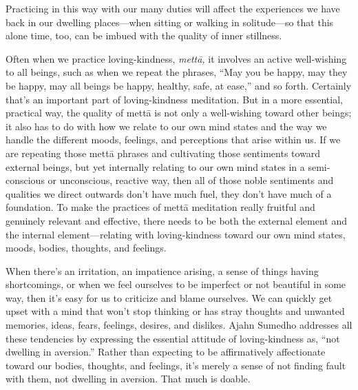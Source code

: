 Practicing in this way with our many duties will affect the experiences 
we have back in our dwelling places---when sitting or walking in 
solitude---so that this alone time, too, can be imbued with the quality 
of inner stillness.


Often when we practice loving-kindness, \emph{mettā,} it involves an 
active well-wishing to all beings, such as when we repeat the phrases, 
``May you be happy, may they be happy, may all beings be happy, 
healthy, safe, at ease,'' and so forth. Certainly that's an important 
part of loving-kindness meditation. But in a more essential, practical 
way, the quality of mettā is not only a well-wishing toward other 
beings; it also has to do with how we relate to our own mind states and 
the way we handle the different moods, feelings, and perceptions that 
arise within us. If we are repeating those mettā phrases and 
cultivating those sentiments toward external beings, but yet internally 
relating to our own mind states in a semi-conscious or unconscious, 
reactive way, then all of those noble sentiments and qualities we 
direct outwards don't have much fuel, they don't have much of a 
foundation. To make the practices of mettā meditation really fruitful 
and genuinely relevant and effective, there needs to be both the 
external element and the internal element---relating with 
loving-kindness toward our own mind states, moods, bodies, thoughts, 
and feelings.

When there's an irritation, an impatience arising, a sense of things 
having shortcomings, or when we feel ourselves to be imperfect or not 
beautiful in some way, then it's easy for us to criticize and blame 
ourselves. We can quickly get upset with a mind that won't stop 
thinking or has stray thoughts and unwanted memories, ideas, fears, 
feelings, desires, and dislikes. Ajahn Sumedho addresses all these 
tendencies by expressing the essential attitude of loving-kindness as, 
``not dwelling in aversion.'' Rather than expecting to be affirmatively 
affectionate toward our bodies, thoughts, and feelings, it's merely a 
sense of not finding fault with them, not dwelling in aversion. That 
much is doable.


